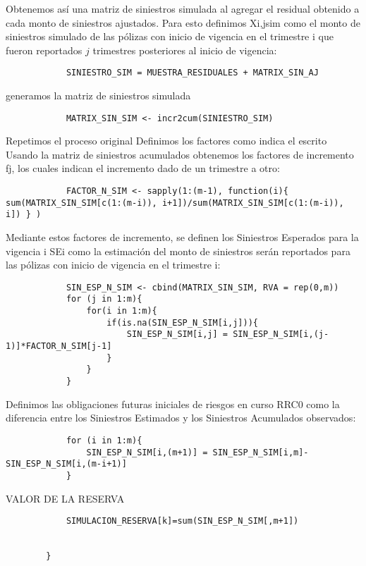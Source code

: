 \documentclass[11pt,twoside,openright,spanish]{report}
\numberwithin{equation}{chapter}
\numberwithin{figure}{chapter}
\numberwithin{table}{chapter}
\begin{document}
\vspace{0.3cm}
Obtenemos así una matriz de siniestros simulada al agregar el residual obtenido a cada monto de siniestros ajustados.
Para esto definimos Xi,j{sim} como el monto de siniestros simulado de las pólizas con inicio de vigencia en el trimestre i que fueron reportados $j$ trimestres posteriores al inicio de vigencia:
\begin{lstlisting}				
			SINIESTRO_SIM = MUESTRA_RESIDUALES + MATRIX_SIN_AJ
\end{lstlisting}

\vspace{0.3cm}
generamos la matriz de siniestros simulada
\begin{lstlisting}				
			MATRIX_SIN_SIM <- incr2cum(SINIESTRO_SIM)
\end{lstlisting}

\vspace{0.3cm}
Repetimos el proceso original
Definimos los factores como indica el escrito
Usando la matriz de siniestros acumulados obtenemos los factores de incremento fj, los cuales indican el incremento dado de un trimestre a otro:
\begin{lstlisting}				
			FACTOR_N_SIM <- sapply(1:(m-1), function(i){ sum(MATRIX_SIN_SIM[c(1:(m-i)), i+1])/sum(MATRIX_SIN_SIM[c(1:(m-i)), i]) } )
\end{lstlisting}

\vspace{0.3cm}
Mediante estos factores de incremento, se definen los Siniestros Esperados para la vigencia i SEi como la estimación del monto de siniestros serán reportados para las pólizas con inicio de vigencia en el trimestre i:
\begin{lstlisting}				
			SIN_ESP_N_SIM <- cbind(MATRIX_SIN_SIM, RVA = rep(0,m))
			for (j in 1:m){
				for(i in 1:m){
					if(is.na(SIN_ESP_N_SIM[i,j])){
						SIN_ESP_N_SIM[i,j] = SIN_ESP_N_SIM[i,(j-1)]*FACTOR_N_SIM[j-1]
					}
				}
			}
\end{lstlisting}

\vspace{0.3cm}
Definimos las obligaciones futuras iniciales de riesgos en curso RRC0 como la diferencia entre los Siniestros Estimados y los Siniestros Acumulados observados:
\begin{lstlisting}				
			for (i in 1:m){
				SIN_ESP_N_SIM[i,(m+1)] = SIN_ESP_N_SIM[i,m]-SIN_ESP_N_SIM[i,(m-i+1)]
			}
\end{lstlisting}

\vspace{0.3cm}
VALOR DE LA RESERVA
\begin{lstlisting}				
			SIMULACION_RESERVA[k]=sum(SIN_ESP_N_SIM[,m+1])
			
			
		}
\end{lstlisting}
\end{document}

